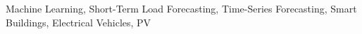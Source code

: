 
\noindent Machine Learning, Short-Term Load Forecasting, Time-Series Forecasting, Smart Buildings, Electrical Vehicles, PV